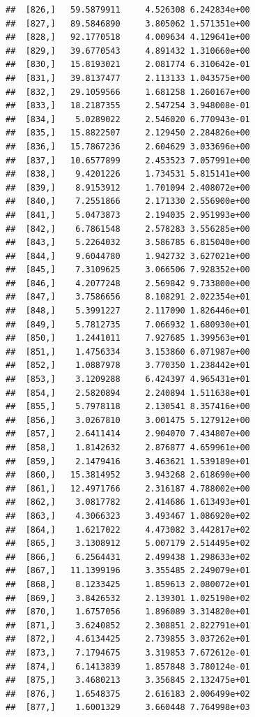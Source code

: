 \documentclass[article]{jss}\usepackage[]{graphicx}\usepackage[]{xcolor}
\makeatletter
\newenvironment{kframe}{%
 \def\at@end@of@kframe{}%
 \ifinner\ifhmode%
  \def\at@end@of@kframe{\end{minipage}}%
  \begin{minipage}{\columnwidth}%
 \fi\fi%
 \def\FrameCommand##1{\hskip\@totalleftmargin \hskip-\fboxsep
 \colorbox{shadecolor}{##1}\hskip-\fboxsep
     \hskip-\linewidth \hskip-\@totalleftmargin \hskip\columnwidth}%
 \MakeFramed {\advance\hsize-\width
   \@totalleftmargin\z@ \linewidth\hsize
   \@setminipage}}%
 {\par\unskip\endMakeFramed%
 \at@end@of@kframe}
\newenvironment{knitrout}{}{} %
\makeatother
\begin{document}
\begin{knitrout}
\begin{kframe}
\begin{verbatim}
##  [826,]   59.5879911     4.526308 6.242834e+00
##  [827,]   89.5846890     3.805062 1.571351e+00
##  [828,]   92.1770518     4.009634 4.129641e+00
##  [829,]   39.6770543     4.891432 1.310660e+00
##  [830,]   15.8193021     2.081774 6.310642e-01
##  [831,]   39.8137477     2.113133 1.043575e+00
##  [832,]   29.1059566     1.681258 1.260167e+00
##  [833,]   18.2187355     2.547254 3.948008e-01
##  [834,]    5.0289022     2.546020 6.770943e-01
##  [835,]   15.8822507     2.129450 2.284826e+00
##  [836,]   15.7867236     2.604629 3.033696e+00
##  [837,]   10.6577899     2.453523 7.057991e+00
##  [838,]    9.4201226     1.734531 5.815141e+00
##  [839,]    8.9153912     1.701094 2.408072e+00
##  [840,]    7.2551866     2.171330 2.556900e+00
##  [841,]    5.0473873     2.194035 2.951993e+00
##  [842,]    6.7861548     2.578283 3.556285e+00
##  [843,]    5.2264032     3.586785 6.815040e+00
##  [844,]    9.6044780     1.942732 3.627021e+00
##  [845,]    7.3109625     3.066506 7.928352e+00
##  [846,]    4.2077248     2.569842 9.733800e+00
##  [847,]    3.7586656     8.108291 2.022354e+01
##  [848,]    5.3991227     2.117090 1.826446e+01
##  [849,]    5.7812735     7.066932 1.680930e+01
##  [850,]    1.2441011     7.927685 1.399563e+01
##  [851,]    1.4756334     3.153860 6.071987e+00
##  [852,]    1.0887978     3.770350 1.238442e+01
##  [853,]    3.1209288     6.424397 4.965431e+01
##  [854,]    2.5820894     2.240894 1.511638e+01
##  [855,]    5.7978118     2.130541 8.357416e+00
##  [856,]    3.0267810     3.001475 5.127912e+00
##  [857,]    2.6411414     2.904070 7.434807e+00
##  [858,]    1.8142632     2.876877 4.659961e+00
##  [859,]    2.1479416     3.463621 1.539189e+01
##  [860,]   15.3814952     3.943268 2.618690e+00
##  [861,]   12.4971766     2.316187 4.788002e+00
##  [862,]    3.0817782     2.414686 1.613493e+01
##  [863,]    4.3066323     3.493467 1.086920e+02
##  [864,]    1.6217022     4.473082 3.442817e+02
##  [865,]    3.1308912     5.007179 2.514495e+02
##  [866,]    6.2564431     2.499438 1.298633e+02
##  [867,]   11.1399196     3.355485 2.249079e+01
##  [868,]    8.1233425     1.859613 2.080072e+01
##  [869,]    3.8426532     2.139301 1.025190e+02
##  [870,]    1.6757056     1.896089 3.314820e+01
##  [871,]    3.6240852     2.308851 2.822791e+01
##  [872,]    4.6134425     2.739855 3.037262e+01
##  [873,]    7.1794675     3.319853 7.672612e-01
##  [874,]    6.1413839     1.857848 3.780124e-01
##  [875,]    3.4680213     3.356845 2.132475e+01
##  [876,]    1.6548375     2.616183 2.006499e+02
##  [877,]    1.6001329     3.660448 7.764998e+03

\end{verbatim}
\end{kframe}
\end{knitrout}
\end{document}

